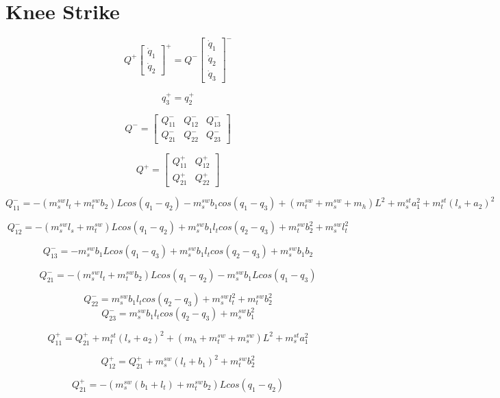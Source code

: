 \section*{Knee Strike}

\[
Q^{+}\left[\begin{array}{c}
\dot{q}_{1}\\
\dot{q}_{2}\end{array}\right]^{+}=Q^{-}\left[\begin{array}{c}
\dot{q}_{1}\\
\dot{q}_{2}\\
\dot{q}_{3}\end{array}\right]^{-}\]


\[
q_{3}^{+}=q_{2}^{+}\]


\[
Q^{-}=\left[\begin{array}{ccc}
Q_{11}^{-} & Q_{12}^{-} & Q_{13}^{-}\\
Q_{21}^{-} & Q_{22}^{-} & Q_{23}^{-}\end{array}\right]\]


\[
Q^{+}=\left[\begin{array}{cc}
Q_{11}^{+} & Q_{12}^{+}\\
Q_{21}^{+} & Q_{22}^{+}\end{array}\right]\]


\[
Q_{11}^{-}=-(m_{s}^{sw}l_{t}+m_{t}^{sw}b_{2})Lcos(q_{1}-q_{2})-m_{s}^{sw}b_{1}cos(q_{1}-q_{3})+(m_{t}^{sw}+m_{s}^{sw}+m_{h})L^{2}+m_{s}^{st}a_{1}^{2}+m_{t}^{st}(l_{s}+a_{2})^{2}\]


\[
Q_{12}^{-}=-(m_{s}^{sw}l_{s}+m_{t}^{sw})Lcos(q_{1}-q_{2})+m_{s}^{sw}b_{1}l_{t}cos(q_{2}-q_{3})+m_{t}^{sw}b_{2}^{2}+m_{s}^{sw}l_{t}^{2}\]


\[
Q_{13}^{-}=-m_{s}^{sw}b_{1}Lcos(q_{1}-q_{3})+m_{s}^{sw}b_{1}l_{t}cos(q_{2}-q_{3})+m_{s}^{sw}b_{1}b_{2}\]


\[
Q_{21}^{-}=-(m_{s}^{sw}l_{t}+m_{t}^{sw}b_{2})Lcos(q_{1}-q_{2})-m_{s}^{sw}b_{1}Lcos(q_{1}-q_{3})\]


\[
Q_{22}^{-}=m_{s}^{sw}b_{1}l_{t}cos(q_{2}-q_{3})+m_{s}^{sw}l_{t}^{2}+m_{t}^{sw}b_{2}^{2}\]
\[
Q_{23}^{-}=m_{s}^{sw}b_{1}l_{t}cos(q_{2}-q_{3})+m_{s}^{sw}b_{1}^{2}\]


\[
Q_{11}^{+}=Q_{21}^{+}+m_{t}^{st}(l_{s}+a_{2})^{2}+(m_{h}+m_{t}^{sw}+m_{s}^{sw})L^{2}+m_{s}^{st}a_{1}^{2}\]


\[
Q_{12}^{+}=Q_{21}^{+}+m_{s}^{sw}(l_{t}+b_{1})^{2}+m_{t}^{sw}b_{2}^{2}\]


\[
Q_{21}^{+}=-(m_{s}^{sw}(b_{1}+l_{t})+m_{t}^{sw}b_{2})Lcos(q_{1}-q_{2})\]


